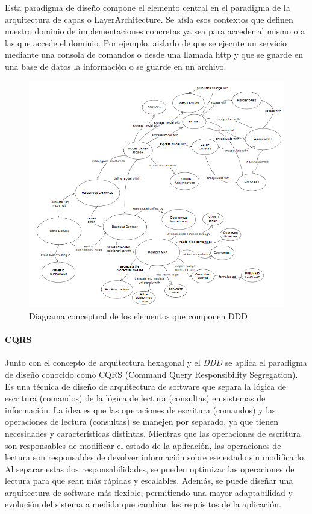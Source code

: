 Esta paradigma de diseño compone el elemento central en el paradigma de la arquitectura de capas o \gls{LayerArchitecture}.
Se aísla esos contextos que definen nuestro dominio de implementaciones concretas ya sea para acceder al mismo o a las que accede el dominio.
Por ejemplo, aislarlo de que se ejecute un servicio mediante una consola de comandos o desde una llamada http y que se guarde en una base de datos la información o se guarde en un archivo.

\begin{figure}[H]
    \centering
    \includegraphics[height=0.6\textheight]{./part/Proyecto_ejecutivo/memoria_descriptiva/infoPreviaAntecedentes/img/DomainDrivenDesignReference}
    \caption{Diagrama conceptual de los elementos que componen DDD\cite{EricEvans2003DDTC}}\label{fig:DomainDrivenDesignReference}
\end{figure}

\paragraph{CQRS}

Junto con el concepto de arquitectura hexagonal y el \textit{DDD} se aplica el paradigma de diseño conocido como \gls{CQRS} (Command Query Responsibility Segregation).
Es una técnica de diseño de arquitectura de software que separa la lógica de escritura (comandos) de la lógica de lectura (consultas) en sistemas de información.
La idea es que las operaciones de escritura (comandos) y las operaciones de lectura (consultas) se manejen por separado, ya que tienen necesidades y características distintas.
Mientras que las operaciones de escritura son responsables de modificar el estado de la aplicación, las operaciones de lectura son responsables de devolver información sobre ese estado sin modificarlo.
Al separar estas dos responsabilidades, se pueden optimizar las operaciones de lectura para que sean más rápidas y escalables.
Además, se puede diseñar una arquitectura de software más flexible, permitiendo una mayor adaptabilidad y evolución del sistema a medida que cambian los requisitos de la aplicación.

